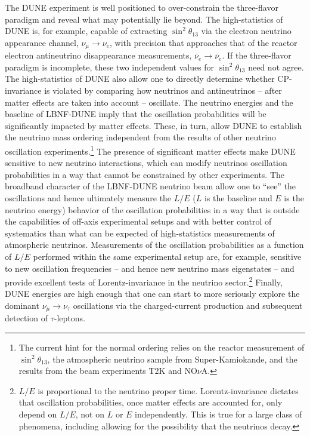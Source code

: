 The DUNE experiment is well positioned to over-constrain  the three-flavor paradigm and reveal what may potentially lie beyond. The high-statistics of DUNE is, for example, capable of extracting $\sin^2\theta_{13}$ via the electron neutrino appearance channel, $\nu_{\mu}\to\nu_e$, with precision that approaches that of the reactor electron antineutrino disappearance measurements, $\bar{\nu}_e\to\bar{\nu}_e$. If the three-flavor paradigm is incomplete, these two independent values for $\sin^2\theta_{13}$ need not agree. The high-statistics of DUNE also allow one to directly determine whether CP-invariance is violated by comparing how neutrinos and antineutrinos -- after matter effects are taken into account -- oscillate. The neutrino energies and the baseline of LBNF-DUNE imply that the oscillation probabilities will be significantly impacted by matter effects. These, in turn, allow DUNE to establish the neutrino mass ordering independent from the results of other neutrino oscillation experiments.\footnote{The current hint for the normal ordering relies on the reactor measurement of $\sin^2\theta_{13}$, the atmospheric neutrino sample from Super-Kamiokande, and the results from the beam experiments T2K and NO$\nu$A.} The presence of significant matter effects make DUNE sensitive to new neutrino interactions, which can modify neutrinos oscillation probabilities in a way that cannot be constrained by other experiments. The broadband character of the LBNF-DUNE neutrino beam allow one to ``see'' the oscillations and hence ultimately measure the $L/E$ ($L$ is the baseline and $E$ is the neutrino energy) behavior of the oscillation probabilities in a way that is outside the capabilities of off-axis experimental setups and with better control of systematics than what can be expected of high-statistics measurements of atmospheric neutrinos. Measurements of the oscillation probabilities as a function of $L/E$ performed within the same experimental setup are, for example, sensitive to new oscillation frequencies -- and hence new neutrino mass eigenstates -- and provide excellent tests of Lorentz-invariance in the neutrino sector.\footnote{$L/E$ is proportional to the neutrino proper time. Lorentz-invariance dictates that oscillation probabilities, once matter effects are accounted for, only depend on $L/E$, not on $L$ or $E$ independently. This is true for a large class of phenomena, including allowing for the possibility that the neutrinos decay.} Finally, DUNE energies are high enough that one can start to more seriously explore the dominant $\nu_{\mu}\to\nu_{\tau}$ oscillations via the charged-current production and subsequent detection of $\tau$-leptons. 

